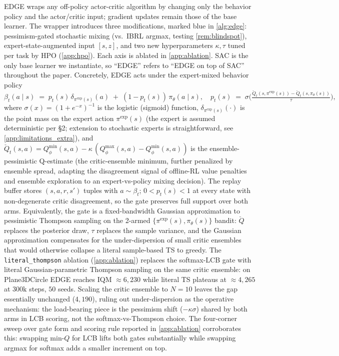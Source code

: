 \documentclass{article}
\begin{document}
EDGE wraps any off-policy actor-critic algorithm by changing only the
behavior policy and the actor/critic input; gradient updates remain
those of the base learner. The wrapper introduces three modifications,
marked blue in \cref{alg:edge}: pessimism-gated stochastic mixing
(vs.\ IBRL argmax, testing \cref{rem:blindspot}),
expert-state-augmented input $[s, z]$, and two new hyperparameters
$\kappa, \tau$ tuned per task by HPO (\cref{app:hpo}). Each axis is
ablated in \cref{app:ablation}. SAC is the only base learner we
instantiate, so ``EDGE'' refers to ``EDGE on top of SAC'' throughout
the paper. Concretely, EDGE acts under the expert-mixed behavior
policy
\begin{equation}
    \beta_t(a\mid s) \;=\; p_t(s)\,\delta_{\pi^{\mathrm{exp}}(s)}(a)
    \;+\;(1-p_t(s))\,\pi_\theta(a\mid s),
    \quad
    p_t(s) \;=\; \sigma\!\Big(\tfrac{\check{Q}_t(s,\pi^{\mathrm{exp}}(s)) -
                              \check{Q}_t(s,\pi_\theta(s))}{\tau}\Big),
    \label{eq:behavior}
\end{equation}
where $\sigma(x) = (1 + e^{-x})^{-1}$ is the logistic
(sigmoid) function, $\delta_{\pi^{\mathrm{exp}}(s)}(\cdot)$ is the point mass on
the expert action $\pi^{\mathrm{exp}}(s)$ (the expert is assumed deterministic
per \S2; extension to stochastic experts is straightforward, see
\cref{app:limitations_extra}), and
$\check{Q}_t(s,a) = Q^{\min}_\phi(s,a) - \kappa\,(Q^{\max}_\phi(s,a)
- Q^{\min}_\phi(s,a))$ is the ensemble-pessimistic Q-estimate (the
critic-ensemble minimum, further penalized by ensemble spread,
adapting the disagreement signal of offline-RL value penalties
\citep{an2021edac,ghasemipour2022msg} and ensemble exploration
\citep{osband2016bootstrappeddqn,lee2021sunrise} to an
expert-vs-policy mixing decision). The replay buffer stores
$(s, a, r, s')$
tuples with $a \sim \beta_t$; $0 < p_t(s) < 1$ at every state with
non-degenerate critic disagreement, so the gate preserves full
support over both arms. Equivalently, the gate is a fixed-bandwidth
Gaussian approximation to pessimistic Thompson sampling on the
2-armed $\{\pi^{\mathrm{exp}}(s),\pi_\theta(s)\}$ bandit: $\check Q$ replaces the
posterior draw, $\tau$ replaces the sample variance, and the Gaussian
approximation compensates for the under-dispersion of small critic
ensembles \citep{osband2016bootstrappeddqn,an2021edac,ghasemipour2022msg}
that would otherwise collapse a literal sample-based TS to greedy.
The \texttt{literal\_thompson} ablation (\cref{app:ablation})
replaces the softmax-LCB gate with literal Gaussian-parametric
Thompson sampling on the same critic ensemble: on Plane3DCircle
EDGE reaches IQM $\approx 6{,}230$ while literal TS plateaus at
$\approx 4{,}265$ at $300\mathrm{k}$ steps, $50$ seeds. Scaling the
critic ensemble to $N{=}10$ leaves the gap essentially unchanged
($4{,}190$), ruling out under-dispersion as the operative
mechanism: the load-bearing piece is the pessimism shift
($-\kappa\sigma$) shared by both arms in LCB scoring, not the
softmax-vs-Thompson choice. The four-corner sweep over gate form
and scoring rule reported in \cref{app:ablation} corroborates this:
swapping min-$Q$ for LCB lifts both gates substantially while
swapping argmax for softmax adds a smaller increment on top.\label{sec:bandit}
\end{document}
